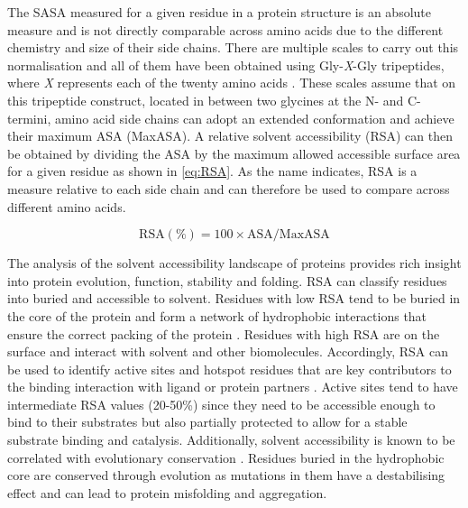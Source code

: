 The SASA measured for a given residue in a protein structure is an absolute measure and is not directly comparable across amino acids due to the different chemistry and size of their side chains. There are multiple scales to carry out this normalisation and all of them have been obtained using Gly-\textit{X}-Gly tripeptides, where \textit{X} represents each of the twenty amino acids \cite{1985_ROSE_MAXASA, MILLER_1987_MAXASA, TIEN_2013_RSA}. These scales assume that on this tripeptide construct, located in between two glycines at the N- and C-termini, amino acid side chains can adopt an extended conformation and achieve their maximum ASA (MaxASA). A relative solvent accessibility (RSA) can then be obtained by dividing the ASA by the maximum allowed accessible surface area for a given residue as shown in \autoref{eq:RSA}. As the name indicates, RSA is a measure relative to each side chain and can therefore be used to compare across different amino acids.

\begin{equation}
\text{RSA} (\%) = 100 \times \text{ASA}/\text{MaxASA}
\label{eq:RSA}
\end{equation}

\vspace{-13pt} %

The analysis of the solvent accessibility landscape of proteins provides rich insight into protein evolution, function, stability and folding. RSA can classify residues into buried and accessible to solvent. Residues with low RSA tend to be buried in the core of the protein and form a network of hydrophobic interactions that ensure the correct packing of the protein \cite{DILL_1990_FOLDING}. Residues with high RSA are on the surface and interact with solvent and other biomolecules. Accordingly, RSA can be used to identify active sites and hotspot residues that are key contributors to the binding interaction with ligand or protein partners \cite{JONES_1997_PROTINTERS}. Active sites tend to have intermediate RSA values (20-50\%) since they need to be accessible enough to bind to their substrates but also partially protected to allow for a stable substrate binding and catalysis. Additionally, solvent accessibility is known to be correlated with evolutionary conservation \cite{GOLDMAN_1998_SS_RSA_EVO}. Residues buried in the hydrophobic core are conserved through evolution as mutations in them have a destabilising effect and can lead to protein misfolding and aggregation.


